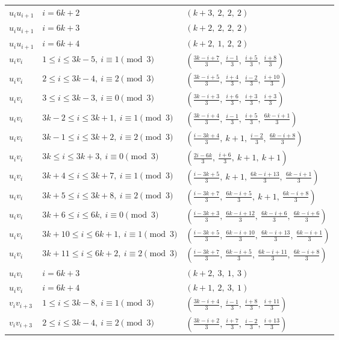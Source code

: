 \begin{longtable}{lll}
$u_i u_{i+1}$ & $i = 6k+2$ & $(k+3,\ 2,\ 2,\ 2)$ \\
$u_i u_{i+1}$ & $i = 6k+3$ & $(k+2,\ 2,\ 2,\ 2)$ \\
$u_i u_{i+1}$ & $i = 6k+4$ & $(k+2,\ 1,\ 2,\ 2)$ \\
$u_i v_i$ & $1 \le i \le 3k-5,\ i \equiv 1 \pmod{3}$ & $(\frac{3k-i+7}{3},\ \frac{i-1}{3},\ \frac{i+5}{3},\ \frac{i+8}{3})$ \\
$u_i v_i$ & $2 \le i \le 3k-4,\ i \equiv 2 \pmod{3}$ & $(\frac{3k-i+5}{3},\ \frac{i+4}{3},\ \frac{i-2}{3},\ \frac{i+10}{3})$ \\
$u_i v_i$ & $3 \le i \le 3k-3,\ i \equiv 0 \pmod{3}$ & $(\frac{3k-i+3}{3},\ \frac{i+6}{3},\ \frac{i+3}{3},\ \frac{i+3}{3})$ \\
$u_i v_i$ & $3k-2 \le i \le 3k+1,\ i \equiv 1 \pmod{3}$ & $(\frac{3k-i+4}{3},\ \frac{i-1}{3},\ \frac{i+5}{3},\ \frac{6k-i+1}{3})$ \\
$u_i v_i$ & $3k-1 \le i \le 3k+2,\ i \equiv 2 \pmod{3}$ & $(\frac{i-3k+4}{3},\ k+1,\ \frac{i-2}{3},\ \frac{6k-i+8}{3})$ \\
$u_i v_i$ & $3k \le i \le 3k+3,\ i \equiv 0 \pmod{3}$ & $(\frac{2i-6k}{3},\ \frac{i+6}{3},\ k+1,\ k+1)$ \\
$u_i v_i$ & $3k+4 \le i \le 3k+7,\ i \equiv 1 \pmod{3}$ & $(\frac{i-3k+5}{3},\ k+1,\ \frac{6k-i+13}{3},\ \frac{6k-i+1}{3})$ \\
$u_i v_i$ & $3k+5 \le i \le 3k+8,\ i \equiv 2 \pmod{3}$ & $(\frac{i-3k+7}{3},\ \frac{6k-i+5}{3},\ k+1,\ \frac{6k-i+8}{3})$ \\
$u_i v_i$ & $3k+6 \le i \le 6k,\ i \equiv 0 \pmod{3}$ & $(\frac{i-3k+3}{3},\ \frac{6k-i+12}{3},\ \frac{6k-i+6}{3},\ \frac{6k-i+6}{3})$ \\
$u_i v_i$ & $3k+10 \le i \le 6k+1,\ i \equiv 1 \pmod{3}$ & $(\frac{i-3k+5}{3},\ \frac{6k-i+10}{3},\ \frac{6k-i+13}{3},\ \frac{6k-i+1}{3})$ \\
$u_i v_i$ & $3k+11 \le i \le 6k+2,\ i \equiv 2 \pmod{3}$ & $(\frac{i-3k+7}{3},\ \frac{6k-i+5}{3},\ \frac{6k-i+11}{3},\ \frac{6k-i+8}{3})$ \\
$u_i v_i$ & $i = 6k+3$ & $(k+2,\ 3,\ 1,\ 3)$ \\
$u_i v_i$ & $i = 6k+4$ & $(k+1,\ 2,\ 3,\ 1)$ \\
$v_i v_{i+3}$ & $1 \le i \le 3k-8,\ i \equiv 1 \pmod{3}$ & $(\frac{3k-i+4}{3},\ \frac{i-1}{3},\ \frac{i+8}{3},\ \frac{i+11}{3})$ \\
$v_i v_{i+3}$ & $2 \le i \le 3k-4,\ i \equiv 2 \pmod{3}$ & $(\frac{3k-i+2}{3},\ \frac{i+7}{3},\ \frac{i-2}{3},\ \frac{i+13}{3})$ \\

\end{longtable}
